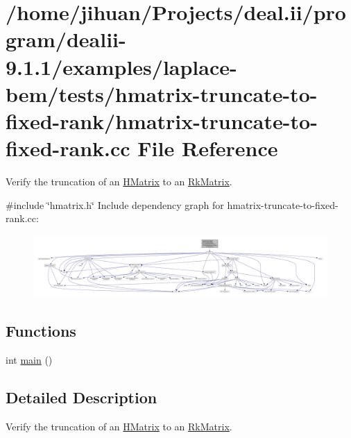 \hypertarget{hmatrix-truncate-to-fixed-rank_8cc}{}\section{/home/jihuan/\+Projects/deal.ii/program/dealii-\/9.1.1/examples/laplace-\/bem/tests/hmatrix-\/truncate-\/to-\/fixed-\/rank/hmatrix-\/truncate-\/to-\/fixed-\/rank.cc File Reference}
\label{hmatrix-truncate-to-fixed-rank_8cc}


Verify the truncation of an \hyperlink{classHMatrix}{H\+Matrix} to an \hyperlink{classRkMatrix}{Rk\+Matrix}.  


{\ttfamily \#include \char`\"{}hmatrix.\+h\char`\"{}}\newline
Include dependency graph for hmatrix-\/truncate-\/to-\/fixed-\/rank.cc\+:
\nopagebreak
\begin{figure}[H]
\begin{center}
\leavevmode
\includegraphics[width=350pt]{hmatrix-truncate-to-fixed-rank_8cc__incl}
\end{center}
\end{figure}
\subsection*{Functions}
\begin{DoxyCompactItemize}
\item 
int \hyperlink{hmatrix-truncate-to-fixed-rank_8cc_ae66f6b31b5ad750f1fe042a706a4e3d4}{main} ()
\end{DoxyCompactItemize}


\subsection{Detailed Description}
Verify the truncation of an \hyperlink{classHMatrix}{H\+Matrix} to an \hyperlink{classRkMatrix}{Rk\+Matrix}. 


